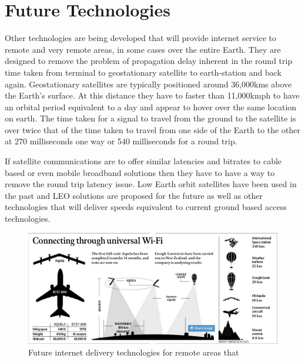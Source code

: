 \section{Future Technologies}
Other technologies are being developed that will provide internet service to remote and very remote areas, in some cases over the entire Earth. They are designed to remove the problem of propagation delay inherent in the round trip time taken from terminal to geostationary satellite to earth-station and back again. Geostationary satellites are typically positioned around 36,000kms above the Earth's surface. At this distance they have to faster than 11,000kmph to have an orbital period equivalent to a day and appear to hover over the same location on earth. The time taken for a signal to travel from the ground to the satellite is over twice that of the time taken to travel from one side of the Earth to the other at 270 milliseconds one way or 540 milliseconds for a round trip.

If satellite communications are to offer similar latencies and bitrates to cable based or even mobile broadband solutions then they have to have a way to remove the round trip latency issue. Low Earth orbit satellites have been used in the past and LEO solutions are proposed for the future as well as other technologies that will deliver speeds equivalent to current ground based access technologies.

\begin{figure}[ht]
\centering
\includegraphics[scale=0.75]{figures/NextgenInternet.png}
\caption{Future internet delivery technologies for remote areas that \cite{RefWorks:354}}
\label{fig:FutureInternet}
\end{figure}


